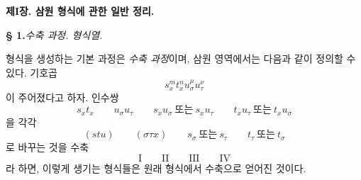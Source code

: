 
\begin{center}
{\Large\bfseries 제I장. \quad 삼원 형식에 관한 일반 정리.}
\end{center}

\begin{center}
\textbf{§ 1.}\quad \emph{수축 과정. 형식열.}
\end{center}

형식을 생성하는 기본 과정은 \emph{수축 과정}이며, 삼원 영역에서는 다음과 같이 정의할 수 있다. 기호곱
\[
s_x^m t_x^n u_\sigma^\mu u_\tau^\nu
\]
이 주어졌다고 하자. 인수쌍
\[
s_xt_x\qquad u_\sigma u_\tau\qquad s_xu_\sigma\ \text{또는}\ s_xu_\tau
\qquad t_xu_\tau\ \text{또는}\ t_xu_\sigma
\]
을 각각
\[
(stu)\qquad (\sigma\tau x)\qquad s_\sigma\ \text{또는}\ s_\tau
\qquad t_\tau\ \text{또는}\ t_\sigma
\]
로 바꾸는 것을 수축
\[
\text{I}\qquad\text{II}\qquad\text{III}\qquad\text{IV}
\]
라 하면, 이렇게 생기는 형식들은 원래 형식에서 수축으로 얻어진 것이다.

